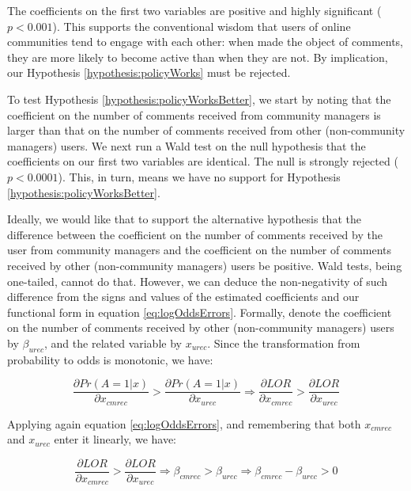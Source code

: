 The coefficients on the first two variables are positive and highly significant ($p < 0.001$). This supports the conventional wisdom that users of online communities tend to engage with each other: when made the object of comments, they are more likely to become active than when they are not. By implication, our Hypothesis \ref{hypothesis:policyWorks} must be rejected. 

To test Hypothesis \ref{hypothesis:policyWorksBetter}, we start by noting that the coefficient on the number of comments received from community managers is larger than that on the number of comments received from other (non-community managers) users. We next run a Wald test on the null hypothesis that the coefficients on our first two variables are identical. The null is strongly rejected ($p < 0.0001$). This, in turn, means we have no support for Hypothesis \ref{hypothesis:policyWorksBetter}. 

Ideally, we would like that to support the alternative hypothesis that the difference between the coefficient on the number of comments received by the user from community managers and the coefficient on the number of comments received by other (non-community managers) users be positive. Wald tests, being one-tailed, cannot do that. However, we can deduce the non-negativity of such difference from the signs and values of the estimated coefficients and our functional form in equation \ref{eq:logOddsErrors}. Formally, denote the  coefficient on the number of comments received by other (non-community managers) users by $\beta_{urec}$, and the related variable by $x_{urec}$. Since the transformation from probability to odds is monotonic, we have:

\begin{equation}
	\frac{\partial Pr(A=1|x)}{\partial x_{cmrec}} > \frac{\partial Pr(A=1|x)}{\partial x_{urec}}  \Rightarrow \frac{\partial LOR}{\partial x_{cmrec}} > \frac{\partial LOR}{\partial x_{urec}} 
\end{equation}

Applying again equation \ref{eq:logOddsErrors}, and remembering that both $x_{cmrec}$ and $x_{urec}$ enter it linearly, we have:

\begin{equation}
	\frac{\partial LOR}{\partial x_{cmrec}} > \frac{\partial LOR}{\partial x_{urec}}\Rightarrow \beta_{cmrec} > \beta_{urec} \Rightarrow \beta_{cmrec} - \beta_{urec} > 0
	\label{eq:condition4WaldTest}
\end{equation}

